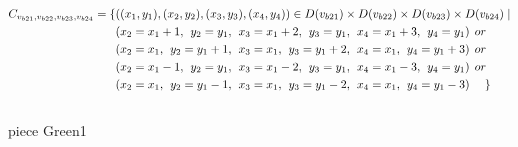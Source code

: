 \begin{align*}
C_{v_{b21},v_{b22},v_{b23},v_{b24}}=\{&((x_{1},y_{1}),(x_{2},y_{2}),(x_{3},y_{3}),(x_{4},y_{4}))\in D(v_{b21})\times D(v_{b22})\times D(v_{b23})\times D(v_{b24})\mid\\
&(x_{2} = x_{1} + 1,\hspace{1ex}y_{2} = y_{1},\hspace{1ex}x_{3} = x_{1} + 2, \hspace{1ex}y_{3} = y_{1},\hspace{1ex}x_{4} = x_{1}+3,\hspace{1ex}y_{4} = y_{1})\hspace{1ex} or\\
&(x_{2} = x_{1},\hspace{1ex}y_{2} = y_{1}+1,\hspace{1ex}x_{3} = x_{1}, \hspace{1ex}y_{3} = y_{1}+2,\hspace{1ex}x_{4} = x_{1},\hspace{1ex}y_{4} = y_{1}+3)\hspace{1ex} or\\
&(x_{2} = x_{1}-1,\hspace{1ex}y_{2} = y_{1},\hspace{1ex}x_{3} = x_{1}-2,\hspace{1ex} y_{3} = y_{1},\hspace{1ex}x_{4} = x_{1}-3,\hspace{1ex}y_{4} = y_{1})\hspace{1ex} or\\
&(x_{2} = x_{1},\hspace{1ex}y_{2} = y_{1}-1,\hspace{1ex}x_{3} = x_{1}, \hspace{1ex}y_{3} = y_{1}-2,\hspace{1ex}x_{4} = x_{1},\hspace{1ex}y_{4} = y_{1}-3)\hspace{3ex} \}
\end{align*}
\\ piece Green1 
